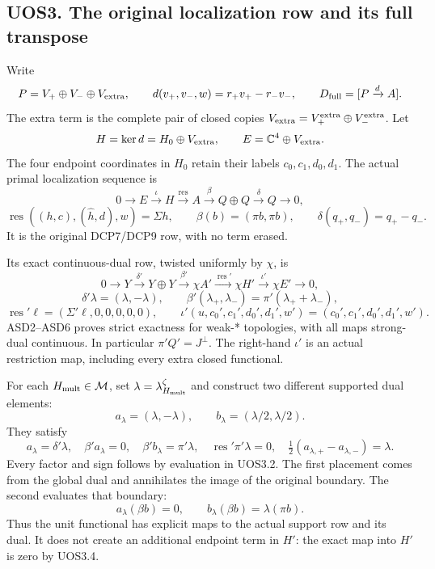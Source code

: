 \subsection{UOS3. The original localization row and its full
transpose}\label{uos3.-the-original-localization-row-and-its-full-transpose}

Write \[
 P=V_+\oplus V_-\oplus V_{\rm extra},\qquad
 d(v_+,v_-,w)=r_+v_+-r_-v_-,\qquad
 D_{\rm full}=[P\xrightarrow d A].
\] The extra term is the complete pair of closed copies
\(V_{\rm extra}=V_+^{\rm extra}\oplus V_-^{\rm extra}\). Let \[
 H=\ker d=H_0\oplus V_{\rm extra},\qquad
 E=\mathbb C^4\oplus V_{\rm extra}.
\] The four endpoint coordinates in \(H_0\) retain their labels
\(c_0,c_1,d_0,d_1\). The actual primal localization sequence is \[
 0\to E\xrightarrow{\iota}H
 \xrightarrow{\operatorname{res}}A
 \xrightarrow{\beta}Q\oplus Q
 \xrightarrow{\delta}Q\to0,
\] \[
 \operatorname{res}((h,c),(\widehat h,d),w)=\Sigma h,\qquad
 \beta(b)=(\pi b,\pi b),\qquad
 \delta(q_+,q_-)=q_+-q_-.
 \tag{UOS3.1}
\] It is the original DCP7/DCP9 row, with no term erased.

Its exact continuous-dual row, twisted uniformly by \(\chi\), is \[
 0\to Y\xrightarrow{\delta'}Y\oplus Y
 \xrightarrow{\beta'}\chi A'
 \xrightarrow{\operatorname{res}'}\chi H'
 \xrightarrow{\iota'}\chi E'\to0,
\] \[
 \delta'\lambda=(\lambda,-\lambda),\qquad
 \beta'(\lambda_+,\lambda_-)=\pi'(\lambda_++\lambda_-),
\] \[
 \operatorname{res}'\ell=(\Sigma'\ell,0,0,0,0,0),
 \qquad
 \iota'(u,c_0',c_1',d_0',d_1',w')
 =(c_0',c_1',d_0',d_1',w').
 \tag{UOS3.2}
\] ASD2--ASD6 proves strict exactness for weak-* topologies, with all
maps strong-dual continuous. In particular \(\pi'Q'=J^\perp\). The
right-hand \(\iota'\) is an actual restriction map, including every
extra closed functional.

For each \(H_{\rm mult}\in\mathcal M\), set
\(\lambda=\lambda_{H_{\rm mult}}^\zeta\) and construct two different
supported dual elements: \[
 a_\lambda=(\lambda,-\lambda),\qquad
 b_\lambda=(\lambda/2,\lambda/2).
 \tag{UOS3.3}
\] They satisfy \[
 a_\lambda=\delta'\lambda,\quad
 \beta'a_\lambda=0,\quad
 \beta'b_\lambda=\pi'\lambda,\quad
 \operatorname{res}'\pi'\lambda=0,\quad
 \tfrac12(a_{\lambda,+}-a_{\lambda,-})=\lambda.
 \tag{UOS3.4}
\] Every factor and sign follows by evaluation in UOS3.2. The first
placement comes from the global dual and annihilates the image of the
original boundary. The second evaluates that boundary: \[
 a_\lambda(\beta b)=0,\qquad
 b_\lambda(\beta b)=\lambda(\pi b).
 \tag{UOS3.5}
\] Thus the unit functional has explicit maps to the actual support row
and its dual. It does not create an additional endpoint term in \(H'\):
the exact map into \(H'\) is zero by UOS3.4.

